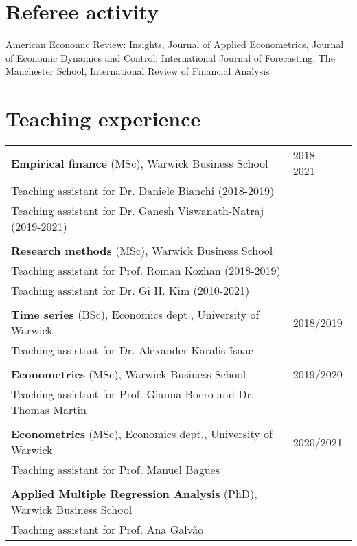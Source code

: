 \documentclass[a4paper,12pt]{article}
\begin{document}
\section{Referee activity}
American Economic Review: Insights, Journal of Applied Econometrics, Journal of Economic Dynamics and Control, International Journal of Forecasting, The Manchester School, International Review of Financial Analysis

\section{Teaching experience}
\begin{tabular*}{\linewidth}{@{}l@{\extracolsep{\fill}}l}
\textbf{Empirical finance} (MSc), Warwick Business School & 2018 - 2021\\[.25em]
\multicolumn{1}{l}{Teaching assistant for Dr. Daniele Bianchi (2018-2019)}\\
\multicolumn{1}{l}{Teaching assistant for Dr. Ganesh Viswanath-Natraj (2019-2021)}\\
\\[.25em]
\textbf{Research methods} (MSc), Warwick Business School \\[.25em]
\multicolumn{1}{l}{Teaching assistant for Prof. Roman Kozhan (2018-2019)}\\
\multicolumn{1}{l}{Teaching assistant for Dr. Gi H. Kim (2010-2021)}\\
\\[.25em]
\textbf{Time series} (BSc), Economics dept., University of Warwick & 2018/2019 \\[.25em]
\multicolumn{1}{l}{Teaching assistant for Dr. Alexander Karalis Isaac} \\
\\[.25em]
\textbf{Econometrics} (MSc), Warwick Business School & 2019/2020\\[.25em]
\multicolumn{1}{l}{Teaching assistant for Prof. Gianna Boero and Dr. Thomas Martin }\\
\\[.25em]
\textbf{Econometrics} (MSc), Economics dept.,  University of Warwick & 2020/2021\\[.25em]
\multicolumn{1}{l}{Teaching assistant for Prof. Manuel Bagues}\\
\\[.25em]
\textbf{Applied Multiple Regression Analysis} (PhD), Warwick Business School \\[.25em]
\multicolumn{1}{l}{Teaching assistant for Prof. Ana Galv\~ao}\\
\end{tabular*}
\end{document}
